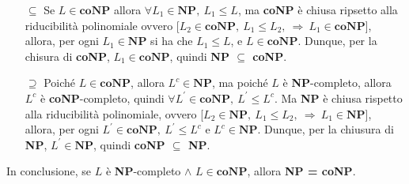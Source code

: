 \begin{itemize}
    \item [$\subseteq$]{
        Se $L \in \textbf{coNP}$ allora $\forall L_{1} \in \textbf{NP},\ L_{1} \leq L$, ma \textbf{coNP} è chiusa ripsetto 
        alla riducibilità polinomiale ovvero [$L_{2} \in \textbf{coNP},\ L_{1} \leq L_{2},\ \Rightarrow\ L_{1} \in \textbf{coNP}$],
        allora, per ogni $L_{1} \in \textbf{NP}$ si ha che $L_{1} \leq L$, e $L \in \textbf{coNP}$. Dunque, per la chisura di \textbf{coNP},
        $L_{1} \in \textbf{coNP}$, quindi \textbf{NP $\subseteq$ coNP}. 
    }
    \item [$\supseteq$]{
        Poiché $L \in \textbf{coNP}$, allora $L^{c} \in \textbf{NP}$, ma poiché $L$ è \textbf{NP}-completo, allora $L^{c}$ è
        \textbf{coNP}-completo, quindi $\forall L^{'} \in \textbf{coNP},\ L^{'} \leq L^{c}$. Ma \textbf{NP} è chiusa rispetto alla 
        riducibilità polinomiale, ovvero [$L_{2} \in \textbf{NP},\ L_{1} \leq L_{2},\ \Rightarrow\ L_{1} \in \textbf{NP}$],
        allora, per ogni $L^{'} \in \textbf{coNP},\ L^{'} \leq L^{c}$ e $L^{c} \in \textbf{NP}$. Dunque, per la chiusura di \textbf{NP}, 
        $L^{'} \in \textbf{NP}$, quindi \textbf{coNP $\subseteq$ NP}.   
    }
\end{itemize}

In conclusione, se $L$ è \textbf{NP}-completo $\land$ $L \in \textbf{coNP}$, allora \textbf{NP = coNP}.